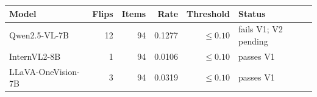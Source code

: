 \begin{tabular}{lrrrrl}
\toprule
Model & Flips & Items & Rate & Threshold & Status \\
\midrule
Qwen2.5-VL-7B & 12 & 94 & 0.1277 & $\leq 0.10$ & fails V1; V2 pending \\
InternVL2-8B & 1 & 94 & 0.0106 & $\leq 0.10$ & passes V1 \\
LLaVA-OneVision-7B & 3 & 94 & 0.0319 & $\leq 0.10$ & passes V1 \\
\bottomrule
\end{tabular}

